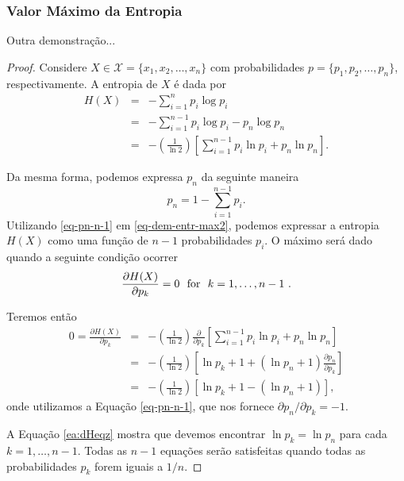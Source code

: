\begin{frame}[allowframebreaks]
  \frametitle{Valor Máximo da Entropia}
  Outra demonstração...

  \begin{proof}
    Considere $X \in \mathcal{X} = \{x_1, x_2, \ldots, x_n\}$ com probabilidades
    $p=\{p_1, p_2, \ldots, p_n\}$, respectivamente. A entropia de $X$ é dada por
    \begin{eqnarray}\label{eq-dem-entr-max2}
    H(X) &=& - \sum_{i=1}^n p_i \log p_i \nonumber \\
        &=& - \sum_{i=1}^{n-1} p_i \log p_i - p_n \log p_n \nonumber \\
        &=& - \left( \frac{1}{\ln 2} \right) \left[ \sum_{i=1}^{n-1} p_i \ln p_i + p_n \ln p_n \right] .
    \end{eqnarray}
    \proofbreak

    Da mesma forma, podemos expressa $p_n$ da seguinte maneira
    \begin{equation}\label{eq-pn-n-1}
    p_n = 1 - \sum_{i=1}^{n-1} p_i .
    \end{equation}
    Utilizando \ref{eq-pn-n-1} em \ref{eq-dem-entr-max2}, podemos expressar
    a entropia $H(X)$ como uma função de $n-1$ probabilidades $p_i$. O máximo
    será dado quando a seguinte condição ocorrer
    \begin{equation}\label{eq:condmaxent}
    \frac{\partial H(X)}{ \partial p_k } = 0 \textmd{ \ for \ } k = 1, \ldots, n-1 \textmd{ .}
    \end{equation}

    \proofbreak
    Teremos então
    \begin{eqnarray}\label{ea:dHeqz}
        0 = \frac{\partial H(X)}{ \partial p_k } &=&  - \left( \frac{1}{\ln 2} \right) \frac{\partial}{ \partial p_k } \left[ \sum_{i=1}^{n-1} p_i \ln p_i  + p_n \ln p_n \right] \nonumber \\
        &=& - \left( \frac{1}{\ln 2} \right) \left[ \ln p_k + 1 + (\ln p_n + 1) \frac{\partial p_n}{ \partial p_k }  \right] \nonumber \\
        &=& - \left( \frac{1}{\ln 2} \right) \left[ \ln p_k + 1 - (\ln p_n + 1) \right] ,
    \end{eqnarray}
    onde utilizamos a Equação \ref{eq-pn-n-1}, que nos fornece $\partial p_n / \partial p_k = -1$.

    \proofbreak
    A Equação \ref{ea:dHeqz} mostra que devemos encontrar $\ln p_k = \ln p_n$ para cada $k=1,\ldots,n-1$.
    Todas as $n-1$ equações serão satisfeitas quando todas as probabilidades $p_k$ forem iguais a $1/n$.


\end{proof}
\end{frame}
